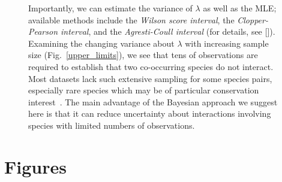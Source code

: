 \documentclass[12pt]{article}
\begin{document}
\begin{figure}[h!]
{    Importantly, we can estimate the variance of $\lambda$ as well as the MLE; available methods include the \emph{Wilson score interval}, the \emph{Clopper-Pearson interval}, and the \emph{Agresti-Coull interval} (for details, see [\citealp{Brown2001}]). Examining the changing variance about $\lambda$ with increasing sample size (Fig.~\ref{upper_limits}), we see that tens of observations are required to establish that two co-occurring species do not interact. Most datasets lack such extensive sampling for some species pairs, especially rare species which may be of particular conservation interest~\citep{Bartomeus2013}. The main advantage of the Bayesian approach we suggest here is that it can reduce uncertainty about interactions involving species with limited numbers of observations.}
\label{Box1}
\end{figure}



\section*{Figures}
\end{document}
